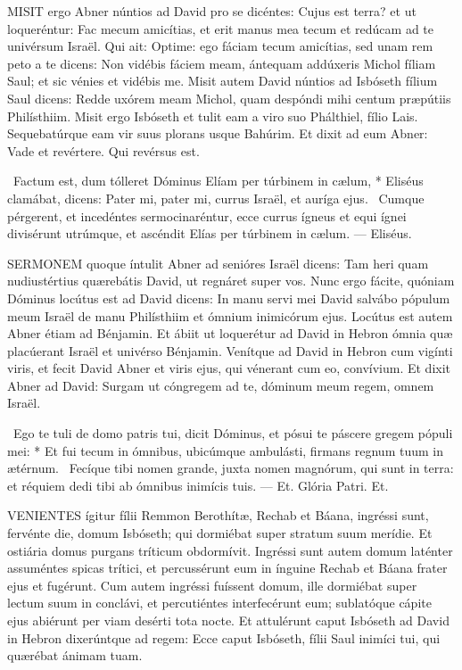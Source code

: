 
\lettrine[lines=2]{M}{ISIT} ergo Abner núntios ad David pro se dicéntes: Cujus est terra? et ut loqueréntur: Fac mecum amicítias, et erit manus mea tecum et redúcam ad te univérsum Israël. Qui ait: Optime: ego fáciam tecum amicítias, sed unam rem peto a te dicens: Non vidébis fáciem meam, ántequam addúxeris Michol fíliam Saul; et sic vénies et vidébis me. Misit autem David núntios ad Isbóseth fílium Saul dicens: Redde uxórem meam Michol, quam despóndi mihi centum præpútiis Philísthiim. Misit ergo Isbóseth et tulit eam a viro suo Phálthiel, fílio Lais. Sequebatúrque eam vir suus plorans usque Bahúrim. Et dixit ad eum Abner: Vade et revértere. Qui revérsus est.

\R\ Factum est, dum tólleret Dóminus Elíam per túrbinem in cælum, * Eliséus clamábat, dicens: Pater mi, pater mi, currus Israël, et auríga ejus. \V\ Cumque pérgerent, et incedéntes sermocinaréntur, ecce currus ígneus et equi ígnei divisérunt utrúmque, et ascéndit Elías per túrbinem in cælum. --- Eliséus.



\lettrine[lines=2]{S}{ERMONEM} quoque íntulit Abner ad senióres Israël dicens: Tam heri quam nudiustértius quærebátis David, ut regnáret super vos. Nunc ergo fácite, quóniam Dóminus locútus est ad David dicens: In manu servi mei David salvábo pópulum meum Israël de manu Philísthiim et ómnium inimicórum ejus. Locútus est autem Abner étiam ad Bénjamin. Et ábiit ut loquerétur ad David in Hebron ómnia quæ placúerant Israël et univérso Bénjamin. Venítque ad David in Hebron cum vigínti viris, et fecit David Abner et viris ejus, qui vénerant cum eo, convívium. Et dixit Abner ad David: Surgam ut cóngregem ad te, dóminum meum regem, omnem Israël.

\R\ Ego te tuli de domo patris tui, dicit Dóminus, et pósui te páscere gregem pópuli mei: * Et fui tecum in ómnibus, ubicúmque ambulásti, firmans regnum tuum in ætérnum. \V\ Fecíque tibi nomen grande, juxta nomen magnórum, qui sunt in terra: et réquiem dedi tibi ab ómnibus inimícis tuis. --- Et. Glória Patri. Et.




\lettrine[lines=2]{V}{ENIENTES} ígitur fílii Remmon Berothítæ, Rechab et Báana, ingréssi sunt, fervénte die, domum Isbóseth; qui dormiébat super stratum suum merídie. Et ostiária domus purgans tríticum obdormívit. Ingréssi sunt autem domum laténter assuméntes spicas trítici, et percussérunt eum in ínguine Rechab et Báana frater ejus et fugérunt. Cum autem ingréssi fuíssent domum, ille dormiébat super lectum suum in conclávi, et percutiéntes interfecérunt eum; sublatóque cápite ejus abiérunt per viam desérti tota nocte. Et attulérunt caput Isbóseth ad David in Hebron dixerúntque ad regem: Ecce caput Isbóseth, fílii Saul inimíci tui, qui quærébat ánimam tuam.

